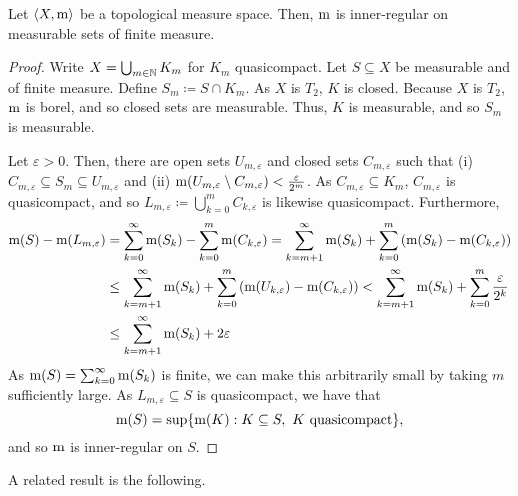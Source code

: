 \begin{prp}\label{InnerRegularFinite}
Let $\langle X,\mathrm{m}\rangle$ be a topological measure space.  Then, $\mathrm{m}$ is inner-regular on measurable sets of finite measure.
\begin{proof}
Write $X=\bigcup _{m\in \mathbb{N}}K_m$ for $K_m$ quasicompact.  Let $S\subseteq X$ be measurable and of finite measure.  Define $S_m\coloneqq S\cap K_m$.  As $X$ is $T_2$, $K$ is closed.  Because $X$ is $T_2$, $\mathrm{m}$ is borel, and so closed sets are measurable.  Thus, $K$ is measurable, and so $S_m$ is measurable.
    
Let $\varepsilon >0$.  Then, there are open sets $U_{m,\varepsilon}$ and closed sets $C_{m,\varepsilon}$ such that (i) $C_{m,\varepsilon}\subseteq S_m\subseteq U_{m,\varepsilon}$ and (ii) $\mathrm{m} (U_{m,\varepsilon}\setminus C_{m,\varepsilon})<\frac{\varepsilon}{2^m}$.  As $C_{m,\varepsilon}\subseteq K_m$, $C_{m,\varepsilon}$ is quasicompact, and so $L_{m,\varepsilon}\coloneqq \bigcup _{k=0}^mC_{k,\varepsilon}$ is likewise quasicompact.  Furthermore,
\begin{equation}
\begin{split}
\mathrm{m} (S)-\mathrm{m} (L_{m,\varepsilon}) & =\sum _{k=0}^\infty \mathrm{m} (S_k)-\sum _{k=0}^m\mathrm{m} (C_{k,\varepsilon})=\sum _{k=m+1}^\infty \mathrm{m} (S_k)+\sum _{k=0}^m\left( \mathrm{m} (S_k)-\mathrm{m} (C_{k,\varepsilon})\right) \\
& \leq \sum _{k=m+1}^\infty \mathrm{m} (S_k)+\sum _{k=0}^m\left( \mathrm{m} (U_{k,\varepsilon})-\mathrm{m} (C_{k,\varepsilon})\right) <\sum _{k=m+1}^\infty \mathrm{m} (S_k)+\sum _{k=0}^m\frac{\varepsilon}{2^k} \\
& \leq \sum _{k=m+1}^\infty \mathrm{m} (S_k)+2\varepsilon
\end{split}
\end{equation}
As $\mathrm{m} (S)=\sum _{k=0}^\infty \mathrm{m} (S_k)$ is finite, we can make this arbitrarily small by taking $m$ sufficiently large.  As $L_{m,\varepsilon}\subseteq S$ is quasicompact, we have that
\begin{equation}
\mathrm{m} (S)=\sup \{ \mathrm{m} (K):K\subseteq S,\ K\text{ quasicompact}\} ,
\end{equation}
and so $\mathrm{m}$ is inner-regular on $S$.
\end{proof}
\end{prp}
A related result is the following.
